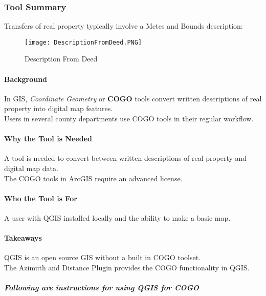 \subsubsection{Tool Summary}
Transfers of real property typically involve a Metes and Bounds description:
\begin{figure}[h!]
\centering
    \texttt{[image: DescriptionFromDeed.PNG]}
\vspace{-.2in}

\caption{Description From Deed}
\end{figure}
\begin{adjmulticols}{2}{\innerMar}{\outerMar}
\paragraph{Background}

In GIS, \textit{Coordinate Geometry} or \textbf{COGO} tools convert written descriptions of real property into digital map features.\\

\noindent Users in several county departments use COGO tools in their regular workflow.\\

\paragraph{Why the Tool is Needed}
A tool is needed to convert between written descriptions of real property and digital map data.\\

\noindent The COGO tools in ArcGIS require an advanced license.
\paragraph{Who the Tool is For}
A user with QGIS installed locally and the ability to make a basic map.
\paragraph{Takeaways}
QGIS is an open source GIS without a built in COGO toolset.\\

\noindent The Azimuth and Distance Plugin provides the COGO functionality in QGIS.
\end{adjmulticols}
\vspace{1in}

\subparagraph{Following are instructions for using QGIS for COGO}

